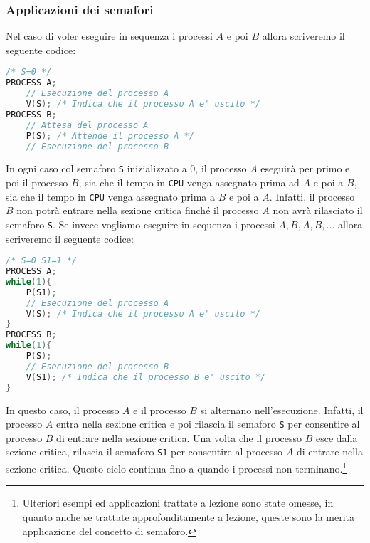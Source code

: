     \subsubsection{Applicazioni dei semafori} 
        Nel caso di voler eseguire in sequenza i processi $A$ e poi $B$ allora scriveremo il seguente codice:
        \begin{lstlisting}[language=C++,basicstyle=\footnotesize]
/* S=0 */
PROCESS A;
    // Esecuzione del processo A
    V(S); /* Indica che il processo A e' uscito */
PROCESS B;
    // Attesa del processo A
    P(S); /* Attende il processo A */
    // Esecuzione del processo B
        \end{lstlisting}
        In ogni caso col semaforo \texttt{S} inizializzato a 0, il processo $A$ eseguirà per primo e poi il processo $B$, sia che il tempo in \texttt{CPU} venga assegnato prima ad $A$ e poi a $B$, sia che il tempo in \texttt{CPU} venga assegnato prima a $B$ e poi a $A$. Infatti, il processo $B$ non potrà entrare nella sezione critica finché il processo $A$ non avrà rilasciato il semaforo \texttt{S}.\newline
        Se invece vogliamo eseguire in sequenza i processi $A, B, A, B,\dots$ allora scriveremo il seguente codice:
        \begin{lstlisting}[language=C++,basicstyle=\footnotesize]
/* S=0 S1=1 */
PROCESS A;
while(1){
    P(S1);
    // Esecuzione del processo A
    V(S); /* Indica che il processo A e' uscito */
}
PROCESS B;
while(1){
    P(S);
    // Esecuzione del processo B
    V(S1); /* Indica che il processo B e' uscito */
}
        \end{lstlisting}
        In questo caso, il processo $A$ e il processo $B$ si alternano nell'esecuzione. Infatti, il processo $A$ entra nella sezione critica e poi rilascia il semaforo \texttt{S} per consentire al processo $B$ di entrare nella sezione critica. Una volta che il processo $B$ esce dalla sezione critica, rilascia il semaforo \texttt{S1} per consentire al processo $A$ di entrare nella sezione critica. Questo ciclo continua fino a quando i processi non terminano.\footnote{Ulteriori esempi ed applicazioni trattate a lezione sono state omesse, in quanto anche se trattate approfonditamente a lezione, queste sono la merita applicazione del concetto di semaforo.}